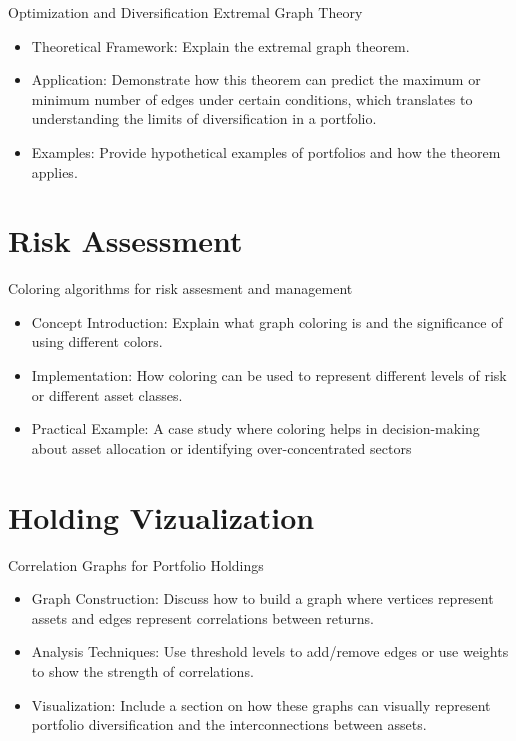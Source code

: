 \documentclass{article}
\begin{document}
Optimization and Diversification
Extremal Graph Theory

\begin{itemize}
    \item Theoretical Framework: Explain the extremal graph theorem.
    \item Application: Demonstrate how this theorem can predict the maximum or minimum number of edges under certain conditions, which translates to understanding the limits of diversification in a portfolio.
    \item Examples: Provide hypothetical examples of portfolios and how the theorem applies.
\end{itemize}


\section{Risk Assessment}
Coloring algorithms for risk assesment and management

\begin{itemize}
    \item Concept Introduction: Explain what graph coloring is and the significance of using different colors.
    \item Implementation: How coloring can be used to represent different levels of risk or different asset classes.
    \item Practical Example: A case study where coloring helps in decision-making about asset allocation or identifying over-concentrated sectors
\end{itemize}


\section{Holding Vizualization}

Correlation Graphs for Portfolio Holdings

\begin{itemize}
    \item Graph Construction: Discuss how to build a graph where vertices represent assets and edges represent correlations between returns.
    \item Analysis Techniques: Use threshold levels to add/remove edges or use weights to show the strength of correlations.
    \item Visualization: Include a section on how these graphs can visually represent portfolio diversification and the interconnections between assets.
\end{itemize}
\end{document}
